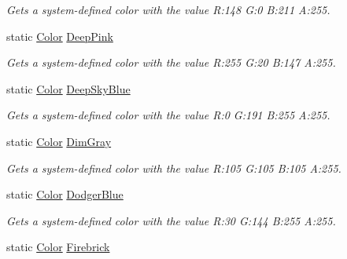 \begin{DoxyCompactItemize}
\begin{DoxyCompactList}\small\item\em Gets a system-\/defined color with the value R\+:148 G\+:0 B\+:211 A\+:255.\end{DoxyCompactList}\item 
static \hyperlink{structMicrosoft_1_1Xna_1_1Framework_1_1Color}{Color} \hyperlink{structMicrosoft_1_1Xna_1_1Framework_1_1Color_ace4c7b4fcf9e1ad4ff74b9b1e166eb2a}{Deep\+Pink}
\begin{DoxyCompactList}\small\item\em Gets a system-\/defined color with the value R\+:255 G\+:20 B\+:147 A\+:255.\end{DoxyCompactList}\item 
static \hyperlink{structMicrosoft_1_1Xna_1_1Framework_1_1Color}{Color} \hyperlink{structMicrosoft_1_1Xna_1_1Framework_1_1Color_a27bbd85b7873d4dfc82f2047ee3e323e}{Deep\+Sky\+Blue}
\begin{DoxyCompactList}\small\item\em Gets a system-\/defined color with the value R\+:0 G\+:191 B\+:255 A\+:255.\end{DoxyCompactList}\item 
static \hyperlink{structMicrosoft_1_1Xna_1_1Framework_1_1Color}{Color} \hyperlink{structMicrosoft_1_1Xna_1_1Framework_1_1Color_a7b14678cca6c42f642b87382dd7a4a0f}{Dim\+Gray}
\begin{DoxyCompactList}\small\item\em Gets a system-\/defined color with the value R\+:105 G\+:105 B\+:105 A\+:255.\end{DoxyCompactList}\item 
static \hyperlink{structMicrosoft_1_1Xna_1_1Framework_1_1Color}{Color} \hyperlink{structMicrosoft_1_1Xna_1_1Framework_1_1Color_a8ed776fe1463ae8ce1c4962d8fbb70b6}{Dodger\+Blue}
\begin{DoxyCompactList}\small\item\em Gets a system-\/defined color with the value R\+:30 G\+:144 B\+:255 A\+:255.\end{DoxyCompactList}\item 
static \hyperlink{structMicrosoft_1_1Xna_1_1Framework_1_1Color}{Color} \hyperlink{structMicrosoft_1_1Xna_1_1Framework_1_1Color_ab0875aabc210eb8f9a0c3714ac0d5ca3}{Firebrick}

\end{DoxyCompactItemize}
